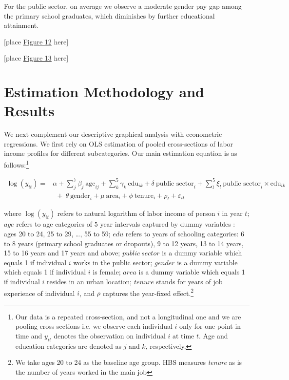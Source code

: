 \documentclass[12pt,author-year]{article}
\begin{document}
For the public sector, on average we observe a moderate gender pay gap among the primary school graduates, which diminishes by further educational attainment. 
\begin{center}
	[place \hyperref[figure12]{Figure 12} here]
\end{center}

\begin{center}
	[place \hyperref[figure12]{Figure 13} here]
\end{center}

\section{Estimation Methodology and Results}
\label{Section4}
We next complement our descriptive graphical analysis with econometric regressions. We first rely on OLS estimation of pooled cross-sections of labor income profiles for different subcategories. Our main estimation equation is as follows:\footnote{Our data is a repeated cross-section, and not a longitudinal one and we are pooling cross-sections i.e. we observe each individual $i$ only for one point in time and $y_{it}$ denotes the observation on individual $i$ at time $t$. Age and education categories are denoted as $j$ and $k$, respectively.}

\begin{align}
\log(y_{it})=  &\alpha+\sum_{j}^7\beta_j \  \text{age}_{ij} + \sum_{k}^5 \gamma_{k} \  \text{edu}_{ik} + \delta \ \text{public sector}_i + \sum_{l}^5 \xi_l \ \text{public sector}_i\times\text{edu}_{ik} \nonumber \\
 & \ \ + \ \theta \ \text{gender}_i + \mu \ \text{area}_i + \phi \ \text{tenure}_i + \rho_t + \varepsilon_{it}
\end{align}

\noindent where $\log(y_{it})$ refers to natural logarithm of labor income of person $i$ in year $t$; $age$ refers to age categories of 5 year intervals captured by dummy variables : ages 20 to 24, 25 to 29, \ldots, 55 to 59; $edu$ refers to years of schooling categories: 6 to 8 years (primary school graduates or dropouts), 9 to 12 years, 13 to 14 years, 15 to 16 years and 17 years and above; $public \ sector$ is a dummy variable which equals 1 if individual $i$ works in the public sector; $gender$ is a dummy variable which equals 1 if individual $i$ is female; $area$ is a dummy variable which equals 1 if individual $i$ resides in an urban location; $tenure$ stands for years of job experience of individual $i$, and $\rho$ captures the year-fixed effect.\footnote{We take ages 20 to 24 as the baseline age group. HBS measures \emph{tenure} as  is the number of years worked in the main job}
\end{document}
